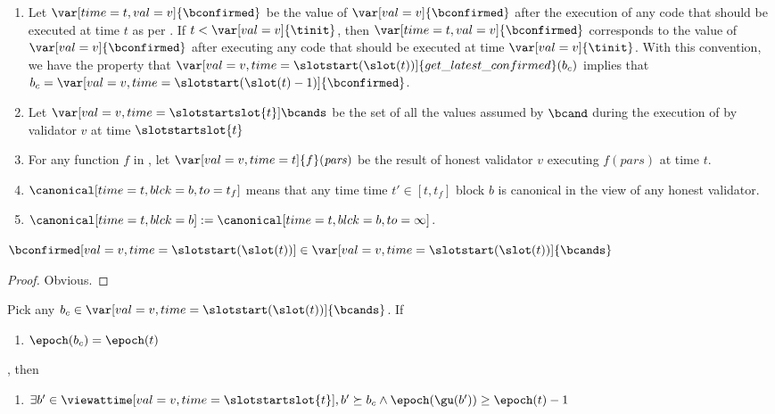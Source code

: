 \documentclass{article}
\begin{document}
\begin{definition}[Notation]\leavevmode\label{def:b-cand-is-b-conf}
    \begin{enumerate}
        \item Let $\var[time=t,val=v]{\bconfirmed}$ be the value of $\var[val=v]{\bconfirmed}$ after the execution of any code that should be executed at time $t$ as per .
        If $t < \var[val=v]{\tinit}$, then $\var[time=t,val=v]{\bconfirmed}$ corresponds to the value of $\var[val=v]{\bconfirmed}$ after executing any code that should be executed at time $\var[val=v]{\tinit}$.
        With this convention, we have the property that $\var[val=v,time=\slotstart(\slot(t))]{get\_latest\_confirmed}(b_c)$ implies that $b_c = \var[val=v,time=\slotstart(\slot(t)-1)]{\bconfirmed}$.
        \item Let $\var[val=v,time=\slotstartslot{t}]{\bcands}$ be the set of all the values assumed by $\bcand$ during the execution of  by validator $v$ at time $\slotstartslot{t}$
        \item For any function $f$ in , let $\var[val=v,time=t]{f}(\mathit{pars})$ be the result of honest validator $v$ executing $f(\mathit{pars})$ at time $t$.        
        \item $\canonical[time=t,blck=b,to=t_f]$ means that any time time $t'\in [t,t_f]$ block $b$ is canonical in the view of any honest validator.
        \item $\canonical[time=t,blck=b] := \canonical[time=t,blck=b,to=\infty]$.
    \end{enumerate}
\end{definition}

\begin{lemma}
    \leavevmode
    $\bconfirmed[val=v,time=\slotstart(\slot(t))] \in \var[val=v,time=\slotstart(\slot(t))]{\bcands}$
\end{lemma}
\begin{proof}
    Obvious.
\end{proof}

\begin{lemma}\label{lem:conf-current-epoch-then-gu-curr-epoch}
    Pick any $b_c \in  \var[val=v,time=\slotstart(\slot(t))]{\bcands}$.
    If
    \begin{enumerate}
        \item $\epoch(b_c) = \epoch(t)$
    \end{enumerate},
    then
    \begin{enumerate}
        \item $\exists b' \in \viewattime[val=v,time=\slotstartslot{t}], b' \succeq b_c \land \epoch(\gu(b')) \geq \epoch(t)-1$
    \end{enumerate}
\end{lemma}
\end{document}
